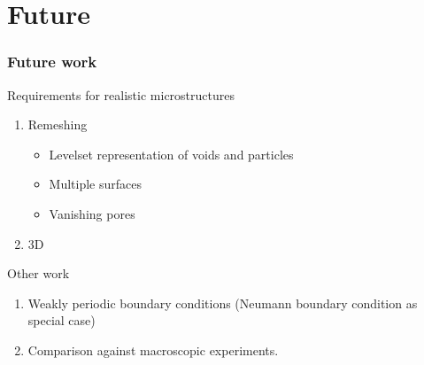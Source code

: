 \documentclass[11pt,mathserif]{beamer}
\begin{document}
\section{Future}
\begin{frame}
 \frametitle{Future work}
 Requirements for realistic microstructures
 \begin{enumerate}
  \item Remeshing
  \begin{itemize}
   \item Levelset representation of voids and particles
   \item Multiple surfaces
   \item Vanishing pores
  \end{itemize}
  \item 3D
 \end{enumerate}
 Other work
 \begin{enumerate}
  \item Weakly periodic boundary conditions (Neumann boundary condition as special case)
  \item Comparison against macroscopic experiments.
 \end{enumerate}

\end{frame}

\end{document}
